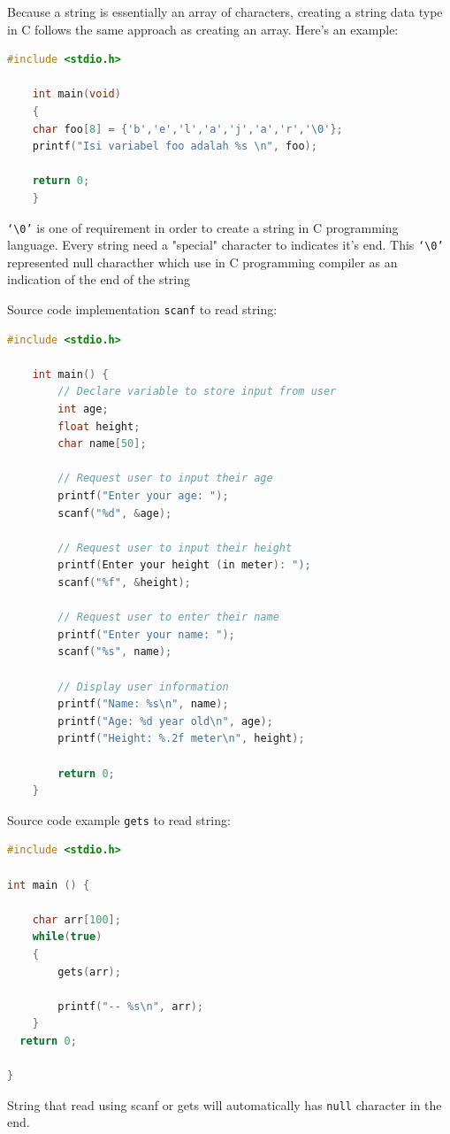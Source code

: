 Because a string is essentially an array of characters, creating a string data type in C follows the same approach as creating an array. Here's an example:
\begin{lstlisting}[language=c,caption = Char in string implementation,label=lst:array1d01]
	#include <stdio.h>
 
	int main(void)
	{
	char foo[8] = {'b','e','l','a','j','a','r','\0'};
	printf("Isi variabel foo adalah %s \n", foo);
	
	return 0;
	}
\end{lstlisting}

\verb|‘\0’| is one of requirement in order to create a string in C programming language.
Every string need a "special" character to indicates it's end.
This \verb|‘\0’| represented null characther which use in C programming compiler as an indication of the end of the string

Source code implementation \verb|scanf| to read string:
\begin{lstlisting}[language=c,caption = String with scanf implementation,label=lst:scanf]
	#include <stdio.h>

	int main() {
		// Declare variable to store input from user
		int age;
		float height;
		char name[50];

		// Request user to input their age
		printf("Enter your age: ");
		scanf("%d", &age);
		
		// Request user to input their height
		printf(Enter your height (in meter): ");
		scanf("%f", &height);
		
		// Request user to enter their name
		printf("Enter your name: ");
		scanf("%s", name);

		// Display user information
		printf("Name: %s\n", name);
		printf("Age: %d year old\n", age);
		printf("Height: %.2f meter\n", height);

		return 0;
	}
\end{lstlisting}


Source code example  \verb|gets| to read string:
\begin{lstlisting}[language=c,caption = String with gets implementation,label=lst:gets]
#include <stdio.h>

int main () {
  
	char arr[100];
	while(true)
	{
		gets(arr);
		
		printf("-- %s\n", arr);
	}
  return 0;

}
\end{lstlisting}

String that read using scanf or gets will automatically has \verb|null| character in the end.
